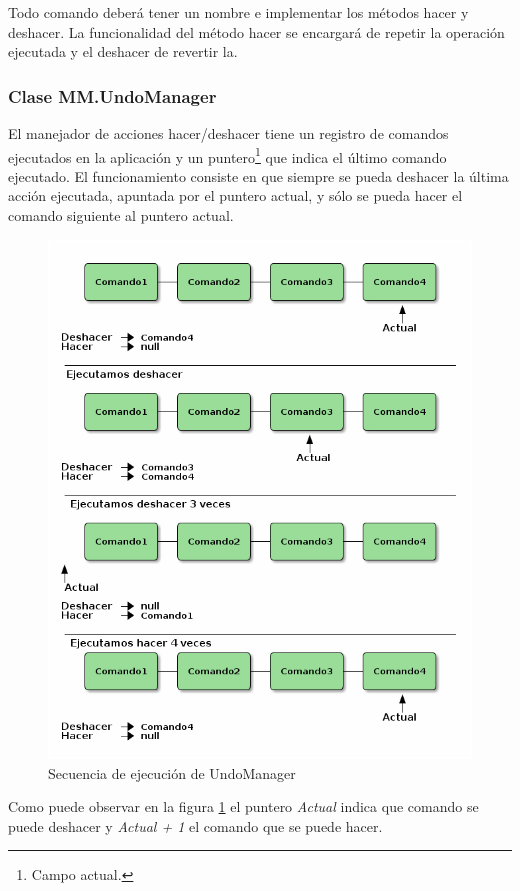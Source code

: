 Todo comando deberá tener un nombre e implementar los métodos hacer y deshacer. La funcionalidad del 
método hacer se encargará de repetir la operación ejecutada y el deshacer de revertir la.

\subsubsection{Clase MM.UndoManager}

El manejador de acciones hacer/deshacer tiene un registro de comandos ejecutados en la aplicación y un puntero\footnote{Campo actual.} que indica el último comando ejecutado. El funcionamiento consiste en que siempre se pueda deshacer la última acción ejecutada, apuntada por el puntero actual, y sólo se pueda hacer el comando siguiente al puntero actual.

\begin{figure}[tbph]
\centering
\includegraphics[width=0.7\linewidth]{imagenes/undomangerEjecucion.png}
\caption{Secuencia de ejecución de UndoManager}
\label{fig:undomanager-ejecucion-concepto}
\end{figure}
 
Como puede observar en la figura \ref{fig:undomanager-ejecucion-concepto} el puntero \textit{Actual} indica que comando se puede deshacer y \textit{Actual + 1} el comando que se puede hacer. 

